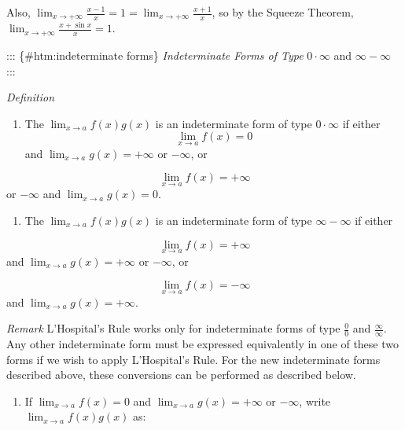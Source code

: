 \documentclass[
  letterpaper,
  DIV=11,
  numbers=noendperiod]{scrartcl}
\providecommand{\tightlist}{%
  \setlength{\itemsep}{0pt}\setlength{\parskip}{0pt}}\usepackage{longtable,booktabs,array}
\theoremstyle{definition}
\theoremstyle{plain}
\theoremstyle{remark}
\begin{document}
Also,
\(\displaystyle\lim_{x\to+\infty}{\frac{x-1}{x}=1=\displaystyle\lim_{x\to+\infty}{\frac{x+1}{x}}}\),
so by the Squeeze Theorem,
\(\displaystyle\lim_{x\to+\infty}{\frac{x+\sin x}{x}=1}\).

::: \{\#htm:indeterminate forms\} \emph{Indeterminate Forms of Type}
\(0\cdot \infty\) and \(\infty -\infty\) :::

\leavevmode{}%
\emph{Definition}

\begin{enumerate}
\def\labelenumi{\arabic{enumi}.}
\tightlist
\item
  The \(\displaystyle\lim_{x\to a}{f(x)g(x)}\) is an indeterminate form
  of type \(0\cdot \infty\) if either \[
  \displaystyle\lim_{x\to a}{f(x)=0}\] and
  \(\displaystyle\lim_{x\to a}{g(x)=+\infty}\) or \(-\infty\), or
\end{enumerate}

\[
\displaystyle\lim_{x\to a}{f(x)=+\infty}
\] or \(-\infty\) and \(\displaystyle\lim_{x\to a}{g(x)=0}\).

\begin{enumerate}
\def\labelenumi{\arabic{enumi}.}
\setcounter{enumi}{1}
\tightlist
\item
  The \(\displaystyle\lim_{x\to a}{f(x)g(x)}\) is an indeterminate form
  of type \(\infty - \infty\) if either
\end{enumerate}

\[
\displaystyle\lim_{x\to a}{f(x)=+\infty}
\] and \(\displaystyle\lim_{x\to a}{g(x)=+\infty}\) or \(-\infty\), or

\[
\displaystyle\lim_{x\to a}{f(x)=-\infty}
\] and \(\displaystyle\lim_{x\to a}{g(x)=+\infty}\).

\leavevmode{}%
\emph{Remark} L'Hospital's Rule works only for indeterminate forms of
type \(\frac{0}{0}\) and \(\frac{\infty}{\infty}\). Any other
indeterminate form must be expressed equivalently in one of these two
forms if we wish to apply L'Hospital's Rule. For the new indeterminate
forms described above, these conversions can be performed as described
below.

\begin{enumerate}
\def\labelenumi{\arabic{enumi}.}
\tightlist
\item
  If \(\displaystyle\lim_{x\to a}{f(x)=0}\) and
  \(\displaystyle\lim_{x\to a}{g(x)=+\infty}\) or \(-\infty\), write
  \(\displaystyle\lim_{x\to a}{f(x)g(x)}\) as:
\end{enumerate}
\end{document}
